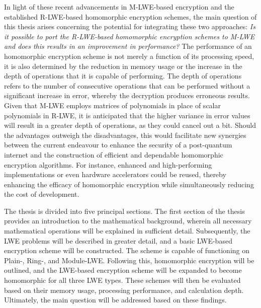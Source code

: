 In light of these recent advancements in M-LWE-based encryption and the established R-LWE-based homomorphic encryption schemes, the main question of this thesis arises concerning the potential for integrating these two approaches: \textit{Is it possible to port the R-LWE-based homomorphic encryption schemes to M-LWE and does this results in an improvement in performance?} The performance of an homomorphic encryption scheme is not merely a function of its processing speed, it is also determined by the reduction in memory usage or the increase in the depth of operations that it is capable of performing. The depth of operations refers to the number of consecutive operations that can be performed without a significant increase in error, whereby the decryption produces erroneous results. Given that M-LWE employs matrices of polynomials in place of scalar polynomials in R-LWE, it is anticipated that the higher variance in error values will result in a greater depth of operations, as they could cancel out a bit. Should the advantages outweigh the disadvantages, this would facilitate new synergies between the current endeavour to enhance the security of a post-quantum internet and the construction of efficient and dependable homomorphic encryption algorithms. For instance, enhanced and high-performing implementations or even hardware accelerators could be reused, thereby enhancing the efficacy of homomorphic encryption while simultaneously reducing the cost of development.

The thesis is divided into five principal sections. The first section of the thesis provides an introduction to the mathematical background, wherein all necessary mathematical operations will be explained in sufficient detail. Subsequently, the LWE problems will be described in greater detail, and a basic LWE-based encryption scheme will be constructed. The scheme is capable of functioning on Plain-, Ring-, and Module-LWE. Following this, homomorphic encryption will be outlined, and the LWE-based encryption scheme will be expanded to become homomorphic for all three LWE types. These schemes will then be evaluated based on their memory usage, processing performance, and calculation depth. Ultimately, the main question will be addressed based on these findings.
